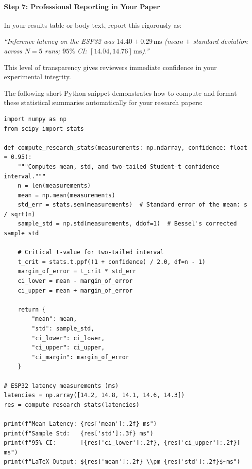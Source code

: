 \begin{example}
\paragraph{Step 7: Professional Reporting in Your Paper}
In your results table or body text, report this rigorously as:
\begin{center}
\emph{``Inference latency on the ESP32 was $14.40 \pm 0.29\,\text{ms}$ (mean $\pm$ standard deviation across $N=5$ runs; $95\%$ CI: $[14.04, 14.76]\,\text{ms}$).''}
\end{center}
This level of transparency gives reviewers immediate confidence in your experimental integrity.
\end{example}

The following short Python snippet demonstrates how to compute and format these statistical summaries automatically for your research papers:

\begin{lstlisting}[style=pythonstyle, caption={Automated Statistical Summaries for Research Reporting.}, label={lst:stat_calc}]
import numpy as np
from scipy import stats

def compute_research_stats(measurements: np.ndarray, confidence: float = 0.95):
    """Computes mean, std, and two-tailed Student-t confidence interval."""
    n = len(measurements)
    mean = np.mean(measurements)
    std_err = stats.sem(measurements)  # Standard error of the mean: s / sqrt(n)
    sample_std = np.std(measurements, ddof=1)  # Bessel's corrected sample std
    
    # Critical t-value for two-tailed interval
    t_crit = stats.t.ppf((1 + confidence) / 2.0, df=n - 1)
    margin_of_error = t_crit * std_err
    ci_lower = mean - margin_of_error
    ci_upper = mean + margin_of_error
    
    return {
        "mean": mean,
        "std": sample_std,
        "ci_lower": ci_lower,
        "ci_upper": ci_upper,
        "ci_margin": margin_of_error
    }

# ESP32 latency measurements (ms)
latencies = np.array([14.2, 14.8, 14.1, 14.6, 14.3])
res = compute_research_stats(latencies)

print(f"Mean Latency: {res['mean']:.2f} ms")
print(f"Sample Std:   {res['std']:.3f} ms")
print(f"95% CI:       [{res['ci_lower']:.2f}, {res['ci_upper']:.2f}] ms")
print(f"LaTeX Output: ${res['mean']:.2f} \\pm {res['std']:.2f}$~ms")
\end{lstlisting}

